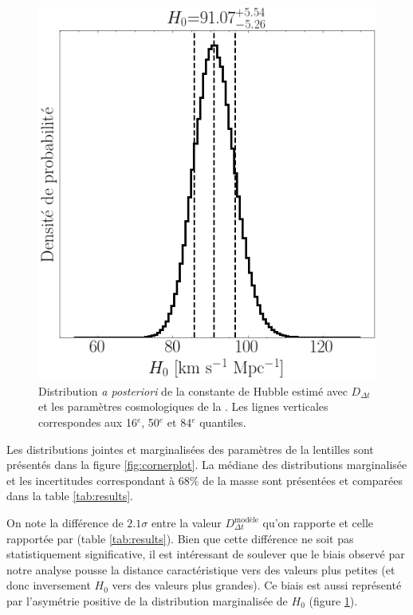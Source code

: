 \documentclass[times,10pt,twocolumn]{article}
\begin{document}
\begin{figure}[H]
        \centering
        \includegraphics[width=0.8\linewidth]{H0_posterior}
        \caption{Distribution \textit{a posteriori} de la constante de Hubble 
        estimé avec $D_{\Delta t}$ et les paramètres cosmologiques de 
la \citet{PlanckCollaboration2018}. Les lignes verticales correspondes 
aux 16$^{e}$, 50$^{e}$ et 84$^{e}$ quantiles.}
        \label{fig:H0}
\end{figure}

Les distributions jointes et marginalisées des paramètres de la lentilles 
sont présentés dans la figure \ref{fig:cornerplot}. La médiane des distributions 
marginalisée et les incertitudes correspondant à $68\%$ de la masse 
sont présentées et comparées dans la table \ref{tab:results}. 

On note la différence de $2.1\sigma$ entre la valeur $D_{\Delta t}^{\text{modèle}}$ 
qu'on rapporte et celle rapportée par \citet{Suyu2013} (table \ref{tab:results}). 
Bien que cette différence ne 
soit pas statistiquement significative, il est intéressant de soulever que le 
biais observé par notre analyse pousse la distance caractéristique vers des valeurs 
plus petites (et donc inversement $H_0$ vers des valeurs plus grandes). Ce biais est aussi 
représenté par
l'asymétrie positive de la distribution 
marginalisée de $H_0$ (figure \ref{fig:H0}). 
\end{document}
